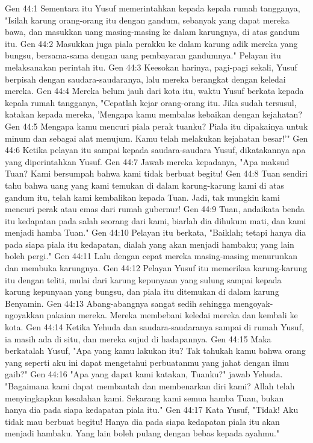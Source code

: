 Gen 44:1  Sementara itu Yusuf memerintahkan kepada kepala rumah tangganya, "Isilah karung orang-orang itu dengan gandum, sebanyak yang dapat mereka bawa, dan masukkan uang masing-masing ke dalam karungnya, di atas gandum itu.
Gen 44:2  Masukkan juga piala perakku ke dalam karung adik mereka yang bungsu, bersama-sama dengan uang pembayaran gandumnya." Pelayan itu melaksanakan perintah itu.
Gen 44:3  Keesokan harinya, pagi-pagi sekali, Yusuf berpisah dengan saudara-saudaranya, lalu mereka berangkat dengan keledai mereka.
Gen 44:4  Mereka belum jauh dari kota itu, waktu Yusuf berkata kepada kepala rumah tangganya, "Cepatlah kejar orang-orang itu. Jika sudah tersusul, katakan kepada mereka, 'Mengapa kamu membalas kebaikan dengan kejahatan?
Gen 44:5  Mengapa kamu mencuri piala perak tuanku? Piala itu dipakainya untuk minum dan sebagai alat menujum. Kamu telah melakukan kejahatan besar!'"
Gen 44:6  Ketika pelayan itu sampai kepada saudara-saudara Yusuf, dikatakannya apa yang diperintahkan Yusuf.
Gen 44:7  Jawab mereka kepadanya, "Apa maksud Tuan? Kami bersumpah bahwa kami tidak berbuat begitu!
Gen 44:8  Tuan sendiri tahu bahwa uang yang kami temukan di dalam karung-karung kami di atas gandum itu, telah kami kembalikan kepada Tuan. Jadi, tak mungkin kami mencuri perak atau emas dari rumah gubernur!
Gen 44:9  Tuan, andaikata benda itu kedapatan pada salah seorang dari kami, biarlah dia dihukum mati, dan kami menjadi hamba Tuan."
Gen 44:10  Pelayan itu berkata, "Baiklah; tetapi hanya dia pada siapa piala itu kedapatan, dialah yang akan menjadi hambaku; yang lain boleh pergi."
Gen 44:11  Lalu dengan cepat mereka masing-masing menurunkan dan membuka karungnya.
Gen 44:12  Pelayan Yusuf itu memeriksa karung-karung itu dengan teliti, mulai dari karung kepunyaan yang sulung sampai kepada karung kepunyaan yang bungsu, dan piala itu ditemukan di dalam karung Benyamin.
Gen 44:13  Abang-abangnya sangat sedih sehingga mengoyak-ngoyakkan pakaian mereka. Mereka membebani keledai mereka dan kembali ke kota.
Gen 44:14  Ketika Yehuda dan saudara-saudaranya sampai di rumah Yusuf, ia masih ada di situ, dan mereka sujud di hadapannya.
Gen 44:15  Maka berkatalah Yusuf, "Apa yang kamu lakukan itu? Tak tahukah kamu bahwa orang yang seperti aku ini dapat mengetahui perbuatanmu yang jahat dengan ilmu gaib?"
Gen 44:16  "Apa yang dapat kami katakan, Tuanku?" jawab Yehuda. "Bagaimana kami dapat membantah dan membenarkan diri kami? Allah telah menyingkapkan kesalahan kami. Sekarang kami semua hamba Tuan, bukan hanya dia pada siapa kedapatan piala itu."
Gen 44:17  Kata Yusuf, "Tidak! Aku tidak mau berbuat begitu! Hanya dia pada siapa kedapatan piala itu akan menjadi hambaku. Yang lain boleh pulang dengan bebas kepada ayahmu."
